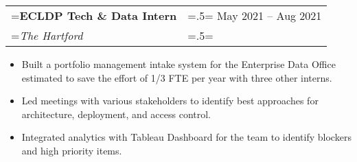 \documentclass{article}
\begin{document}
\hspace{-1em}
\begin{tabularx}{\textwidth}{
    >{\raggedright\arraybackslash\hsize=1.5\hsize\linewidth=\hsize}X
    >{\raggedleft\arraybackslash\hsize=.5\hsize\linewidth=\hsize}X }
    \textbf{ECLDP Tech \& Data Intern} & May 2021 -- Aug 2021\\
    \textit{The Hartford} & \\
\end{tabularx}
\vspace{-.5em}
\begin{itemize}[label={--}, leftmargin=1em]
    \setlength\itemsep{0em}
    \item Built a portfolio management intake system for the Enterprise Data Office estimated to save the effort of 1/3 FTE per year with three other interns.
    \item Led meetings with various stakeholders to identify best approaches for architecture, deployment, and access control.
    \item Integrated analytics with Tableau Dashboard for the team to identify blockers and high priority items.
\end{itemize}


\end{document}

